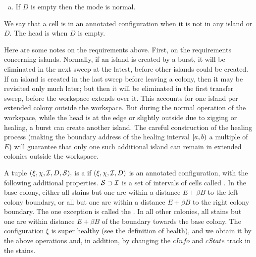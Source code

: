 \documentclass[12pt]{memoir}
\newcommand{\fld}[1]{\ensuremath{\textit{#1}}}
\def\B{B}
\newcommand{\D}{D}
\newcommand{\E}{E}
\newcommand{\cDir}{\fld{cDir}}
\newcommand{\cInfo}{\fld{cInfo}}
\newcommand{\cState}{\fld{cState}}
\begin{document}
\begin{definition}
\begin{enumerate}[(a)]
        \item  If \( \D \) is empty then the mode is normal.
%

 \end{enumerate}

    We say that a cell is  in an annotated configuration
    when it is not in any island or \( \D \).
    The head is  when \( \D \) is empty.
\end{definition}

Here are some notes on the requirements above.
First, on the requirements concerning islands.
Normally, if an island is created by a burst, it will be eliminated in the next sweep at the latest,
before other islands could be created.
If an island is created in the last sweep before leaving a colony,
then it may be revisited only much later; but then it will be eliminated in the first
transfer sweep, before the workspace extends over it.
This accounts for one island per extended colony outside the workspace.
But during the normal operation of the workspace, while the head is at the edge
or slightly outside due to zigging or healing, a burst can create another island.
The careful construction of the healing process (making the boundary address
of the healing interval \( [a,b) \) a multiple of \( \E \)) will 
guarantee that only one such additional
island can remain in extended colonies outside the workspace.

\begin{definition}\label{def:super-annotated}
A tuple \( (\xi,\chi,\cI,\D,\cS), \)
is a  if \( (\xi,\chi,\cI,\D) \) is an annotated configuration, 
with the following additional properties.
\( \mathcal{S} \supset \mathcal{I} \) is a set of intervals of cells called .
In the base colony, either all stains but one are
within a distance \( \E+\beta\B \) to the left colony boundary,
or all but one are within a distance \( \E+\beta\B \)
to the right colony boundary.
The one exception is called the .
In all other colonies, all stains but one are
within distance \( \E + \beta\B \) of the boundary towards the
base colony.
The configuration \( \xi \) is super healthy (see the definition of health), 
and we obtain it by the above operations and, in addition, by
changing the \( \cInfo \) and \( \cState \) track in the stains.
  
\end{definition}
\end{document}
